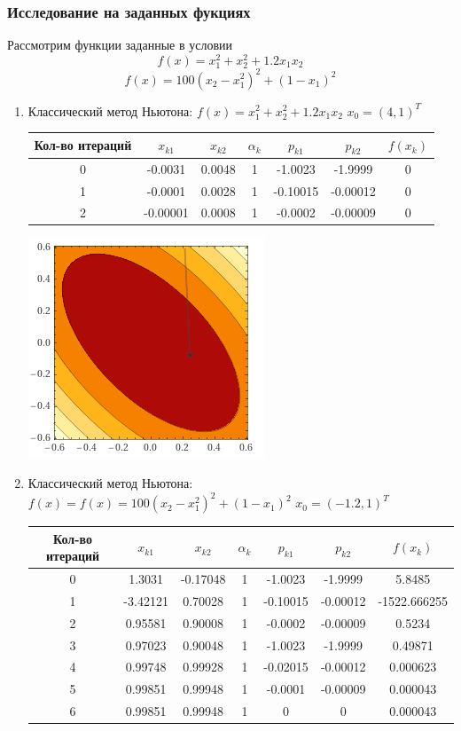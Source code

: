 \documentclass[a4paper, 14pt]{article}
\begin{document}
\subsubsection*{Исследование на заданных фукциях}
Рассмотрим функции заданные в условии
\[
f(x) = x_1^2 + x_2^2 + 1.2x_1x_2\]\[
f(x) = 100(x_2 - x_1^2)^2 + (1 - x_1)^2\]

\begin{enumerate}
\item Классический метод Ньютона: $f(x) = x_1^2 + x_2^2 + 1.2x_1x_2$
$x_0 = (4, 1)^T$\\
\begin{tabular}{  |c | c | c| c| c|c| c|}
\hline
Кол-во итераций & $x_{k1}$ & $x_{k2}$ & $\alpha_k$ & $p_{k1}$& $p_{k2}$ & $f(x_k)$\\ \hline
0 & -0.0031 & 0.0048 &1 & -1.0023 &  -1.9999 & 0 \\
1 & -0.0001  & 0.0028& 1& -0.10015 & -0.00012 & 0\\
2 & -0.00001 & 0.0008 & 1 & -0.0002 & -0.00009 & 0 \\
\hline
\end{tabular}

\includegraphics{img/K3.png}\\
\item Классический метод Ньютона: $f(x) = f(x) = 100(x_2 - x_1^2)^2 + (1 - x_1)^2$
$x_0 = (-1.2, 1)^T$\\
\begin{tabular}{  |c | c | c| c| c|c| c|}
\hline
Кол-во итераций & $x_{k1}$ & $x_{k2}$ & $\alpha_k$ & $p_{k1}$& $p_{k2}$ & $f(x_k)$\\ \hline
0 & 1.3031 & -0.17048 &1 & -1.0023 &  -1.9999 & 5.8485 \\
1 & -3.42121  & 0.70028& 1& -0.10015 & -0.00012 & -1522.666255\\
2 & 0.95581 & 0.90008 & 1 & -0.0002 & -0.00009 & 0.5234 \\
3 & 0.97023 & 0.90048 & 1 & -1.0023 &  -1.9999 & 0.49871 \\
4 & 0.99748  & 0.99928& 1& -0.02015 & -0.00012 & 0.000623\\
5 & 0.99851 & 0.99948 & 1 & -0.0001 & -0.00009 & 0.000043 \\
6 & 0.99851  & 0.99948 & 1& 0 &  0 & 0.000043 \\


\end{tabular}
\end{enumerate}
\end{document}
